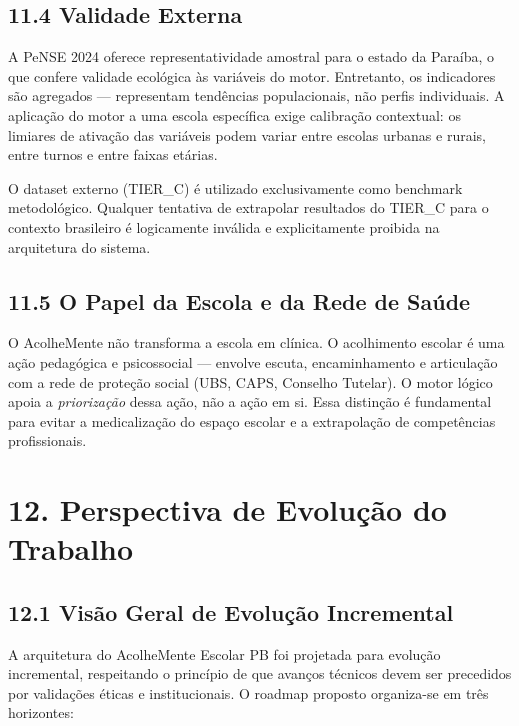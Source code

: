 \documentclass[11pt]{article}
\begin{document}
\subsection{11.4 Validade Externa}\label{validade-externa}

A PeNSE 2024 oferece representatividade amostral para o estado da
Paraíba, o que confere validade ecológica às variáveis do motor.
Entretanto, os indicadores são agregados --- representam tendências
populacionais, não perfis individuais. A aplicação do motor a uma escola
específica exige calibração contextual: os limiares de ativação das
variáveis podem variar entre escolas urbanas e rurais, entre turnos e
entre faixas etárias.

O dataset externo (TIER\_C) é utilizado exclusivamente como benchmark
metodológico. Qualquer tentativa de extrapolar resultados do TIER\_C
para o contexto brasileiro é logicamente inválida e explicitamente
proibida na arquitetura do sistema.

\subsection{11.5 O Papel da Escola e da Rede de
Saúde}\label{o-papel-da-escola-e-da-rede-de-sauxfade}

O AcolheMente não transforma a escola em clínica. O acolhimento escolar
é uma ação pedagógica e psicossocial --- envolve escuta, encaminhamento
e articulação com a rede de proteção social (UBS, CAPS, Conselho
Tutelar). O motor lógico apoia a \emph{priorização} dessa ação, não a
ação em si. Essa distinção é fundamental para evitar a medicalização do
espaço escolar e a extrapolação de competências profissionais.

    \section{12. Perspectiva de Evolução do
Trabalho}\label{perspectiva-de-evoluuxe7uxe3o-do-trabalho}

\subsection{12.1 Visão Geral de Evolução
Incremental}\label{visuxe3o-geral-de-evoluuxe7uxe3o-incremental}

A arquitetura do AcolheMente Escolar PB foi projetada para evolução
incremental, respeitando o princípio de que avanços técnicos devem ser
precedidos por validações éticas e institucionais. O roadmap proposto
organiza-se em três horizontes:
\end{document}
